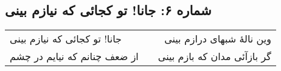 \begin{center}
\section*{شماره ۶: جانا! تو کجائی که نیازم بینی}
\label{sec:006}
\begin{longtable}{l p{0.5cm} r}
جانا! تو کجائی که نیازم بینی
&&
وین نالهٔ شبهای درازم بینی
\\
از ضعف چنانم که نیایم در چشم
&&
گر بازآئی مدان که بازم بینی
\\
\end{longtable}
\end{center}

